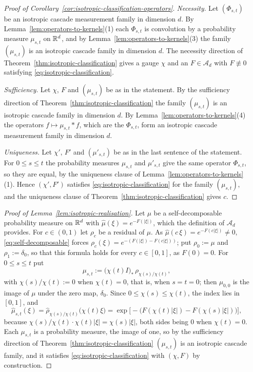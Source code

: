 \begin{proof}[Proof of Corollary~\ref{cor:isotropic-classification-operators}]
\emph{Necessity.} Let $(\Phi_{s,t})$ be an isotropic cascade measurement family in dimension $d$.
By Lemma~\ref{lem:operators-to-kernels}(1) each $\Phi_{s,t}$ is convolution by a probability measure
$\mu_{s,t}$ on $\mathbb{R}^d$, and by Lemma~\ref{lem:operators-to-kernels}(3) the family $(\mu_{s,t})$ is an
isotropic cascade family in dimension $d$. The necessity direction of
Theorem~\ref{thm:isotropic-classification} gives a gauge $\chi$ and an $F \in \mathcal{A}_d$ with
$F \not\equiv 0$ satisfying \ref{eq:isotropic-classification}.

\emph{Sufficiency.} Let $\chi$, $F$ and $(\mu_{s,t})$ be as in the statement. By the sufficiency
direction of Theorem~\ref{thm:isotropic-classification} the family $(\mu_{s,t})$ is an isotropic cascade
family in dimension $d$. By Lemma~\ref{lem:operators-to-kernels}(4) the operators
$f \mapsto \mu_{s,t} * f$, which are the $\Phi_{s,t}$, form an isotropic cascade measurement family
in dimension $d$.

\emph{Uniqueness.} Let $\chi'$, $F'$ and $(\mu'_{s,t})$ be as in the last sentence of the
statement. For $0 \le s \le t$ the probability measures $\mu_{s,t}$ and $\mu'_{s,t}$ give the same
operator $\Phi_{s,t}$, so they are equal, by the uniqueness clause of
Lemma~\ref{lem:operators-to-kernels}(1). Hence $(\chi', F')$ satisfies
\ref{eq:isotropic-classification} for the family $(\mu_{s,t})$, and the uniqueness clause of
Theorem~\ref{thm:isotropic-classification} gives $c$.
\end{proof}

\begin{proof}[Proof of Lemma~\ref{lem:isotropic-realisation}]
Let $\mu$ be a self-decomposable probability measure on $\mathbb{R}^d$ with
$\widehat\mu(\xi) = e^{-F(|\xi|)}$, which the definition of $\mathcal{A}_d$ provides. For
$c \in (0,1)$ let $\rho_c$ be a residual of $\mu$. As $\widehat\mu(c\,\xi) = e^{-F(c|\xi|)} \ne 0$,
\ref{eq:self-decomposable} forces $\widehat\rho_c(\xi) = e^{-(F(|\xi|) - F(c|\xi|))}$; put
$\rho_0 := \mu$ and $\rho_1 := \delta_0$, so that this formula holds for every $c \in [0,1]$, as
$F(0) = 0$. For $0 \le s \le t$ put
\[
  \mu_{s,t} := \bigl(\chi(t)I\bigr)_*\,\rho_{\chi(s)/\chi(t)} ,
\]
with $\chi(s)/\chi(t) := 0$ when $\chi(t) = 0$, that is, when $s = t = 0$; then $\mu_{0,0}$ is
the image of $\mu$ under the zero map, $\delta_0$. Since
$0 \le \chi(s) \le \chi(t)$, the index lies in $[0,1]$, and
\[
  \widehat\mu_{s,t}(\xi) = \widehat\rho_{\chi(s)/\chi(t)}\bigl(\chi(t)\xi\bigr)
  = \exp\bigl[-\bigl(F(\chi(t)|\xi|) - F(\chi(s)|\xi|)\bigr)\bigr] ,
\]
because $\chi(s)/\chi(t)\cdot\chi(t)|\xi| = \chi(s)|\xi|$, both sides being $0$ when
$\chi(t) = 0$. Each $\mu_{s,t}$ is a probability measure, the image of one, so by the sufficiency
direction of Theorem~\ref{thm:isotropic-classification} $(\mu_{s,t})$ is an isotropic cascade family, and
it satisfies \ref{eq:isotropic-classification} with $(\chi, F)$ by construction.
\end{proof}

